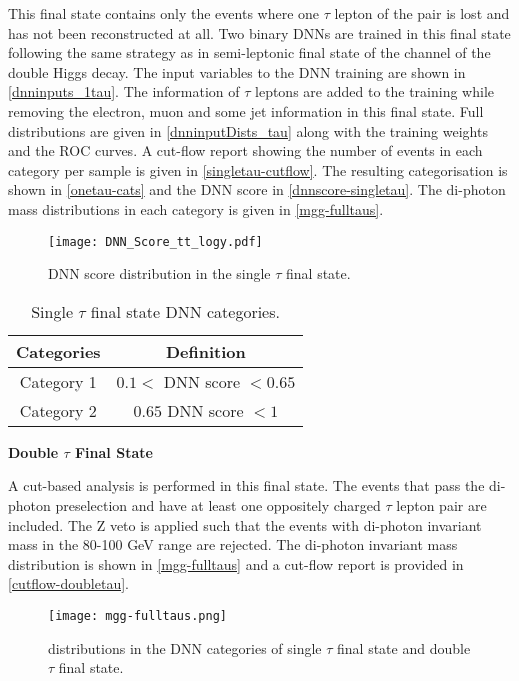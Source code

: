 {This final state contains only the events where one $\tau$ lepton of the pair is lost and has not been reconstructed at all. Two binary DNNs are trained in this final state following the same strategy as in semi-leptonic final state of the \wwgg channel of the double Higgs decay. The input variables to the DNN training are shown in \autoref{dnninputs_1tau}. The information of $\tau$ leptons are added to the training while removing the electron, muon and some jet information in this final state. Full distributions are given in \autoref{dnninputDists_tau} along with the training weights and the ROC curves. A cut-flow report showing the number of events in each category per sample is given in \autoref{singletau-cutflow}. The resulting categorisation is shown in \autoref{onetau-cats} and the DNN score in \autoref{dnnscore-singletau}. The di-photon mass distributions in each category is given in \autoref{mgg-fulltaus}.

\begin{figure}[h!]
    \centering
	\texttt{[image: DNN\_Score\_tt\_logy.pdf]}
	\vspace{2mm}
	\caption{DNN score distribution in the single $\tau$ final state.}
	\label{dnnscore-singletau}
\end{figure}

\begin{table}[h!]
    \centering
    \begin{tabular}{cc}
    \hline
    \hline
        Categories  &   Definition \\
        \hline
        Category 1 & $ 0.1< $ DNN score $ <0.65$ \\
        Category 2 & $ 0.65 $ DNN score $ <1 $\\
         \hline
    \end{tabular}
    \caption{Single $\tau$ final state DNN categories.}
    \label{onetau-cats}
\end{table}

\newpage
\textbf{Double $\tau$ Final State}

A cut-based analysis is performed in this final state. The events that pass the di-photon preselection and have at least one oppositely charged $\tau$ lepton pair are included. The Z veto is applied such that the events with di-photon invariant mass in the 80-100 GeV range are rejected. The di-photon invariant mass distribution is shown in \autoref{mgg-fulltaus} and a cut-flow report is provided in \autoref{cutflow-doubletau}.

\begin{figure}[h!]
    \centering
	\texttt{[image: mgg-fulltaus.png]}
	\vspace{2mm}
	\caption{\mgg distributions in the DNN categories of single $\tau$ final state and double $\tau$ final state.}
	\label{mgg-fulltaus}
\end{figure}

}
